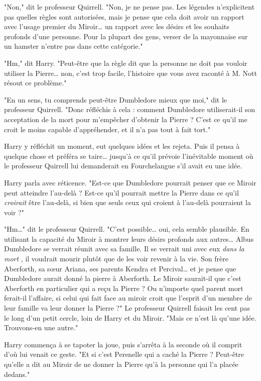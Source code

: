 "Non," dit le professeur Quirrell. "Non, je ne pense pas. Les légendes n'explicitent pas quelles règles sont autorisées, mais je pense que cela doit avoir un rapport avec l'usage premier du Miroir… un rapport avec les désirs et les souhaits profonds d'une personne. Pour la plupart des gens, verser de la mayonnaise sur un hamster n'entre pas dans cette catégorie."

"Hm," dit Harry. "Peut-être que la règle dit que la personne ne doit pas vouloir utiliser la Pierre… non, c'est trop facile, l'histoire que vous avez raconté à M. Nott résout ce problème."

"En un sens, tu comprends peut-être Dumbledore mieux que moi," dit le professeur Quirrell. "Donc réfléchis à cela : comment Dumbledore utiliserait-il son acceptation de la mort pour m'empêcher d'obtenir la Pierre ? C'est ce qu'il me croit le moins capable d'appréhender, et il n'a pas tout à fait tort."

Harry y réfléchit un moment, eut quelques idées et les rejeta. Puis il pensa à quelque chose et préféra se taire… jusqu'à ce qu'il prévoie l'inévitable moment où le professeur Quirrell lui demanderait en Fourchelangue s'il avait eu une idée.

Harry parla avec réticence. "Est-ce que Dumbledore pourrait penser que ce Miroir peut atteindre l'au-delà ? Est-ce qu'il pourrait mettre la Pierre dans ce qu'il \emph{croirait}  être l'au-delà, si bien que seuls ceux qui croient à l'au-delà pourraient la voir ?"

"Hm…" dit le professeur Quirrell. "C'est possible… oui, cela semble plausible. En utilisant la capacité du Miroir à montrer leurs désirs profonds aux autres… Albus Dumbledore se verrait réunit avec sa famille. Il se verrait uni avec eux \emph{dans la mort} , il voudrait mourir plutôt que de les voir revenir à la vie. Son frère Aberforth, sa sœur Ariana, ses parents Kendra et Percival… et je pense que Dumbledore aurait donné la pierre à Aberforth. Le Miroir saurait-il que c'est Aberforth en particulier qui a reçu la Pierre ? Ou n'importe quel parent mort ferait-il l'affaire, si celui qui fait face au miroir croit que l'esprit d'un membre de leur famille va leur donner la Pierre ?" Le professeur Quirrell faisait les cent pas le long d'un petit cercle, loin de Harry et du Miroir. "Mais ce n'est là qu'une idée. Trouvons-en une autre."

Harry commença à se tapoter la joue, puis s'arrêta à la seconde où il comprit d'où lui venait ce geste. "Et si c'est Perenelle qui a caché la Pierre ? Peut-être qu'elle a dit au Miroir de ne donner la Pierre qu'à la personne qui l'a placée dedans."

